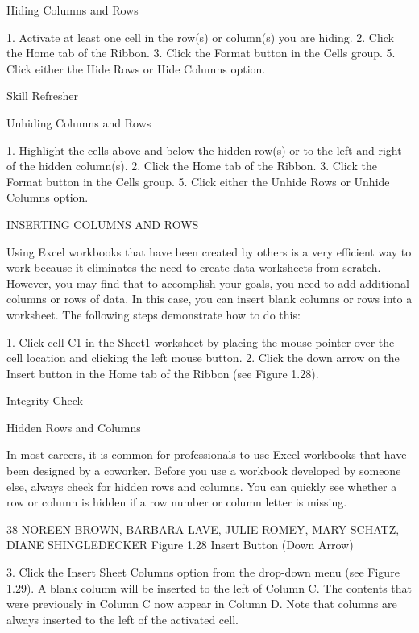 Hiding Columns and Rows

1. Activate at least one cell in the row(s) or column(s) you are hiding.
2. Click the Home tab of the Ribbon.
3. Click the Format button in the Cells group.
5. Click either the Hide Rows or Hide Columns option.




Skill Refresher


Unhiding Columns and Rows

1. Highlight the cells above and below the hidden row(s) or to the left and right of the hidden column(s).
2. Click the Home tab of the Ribbon.
3. Click the Format button in the Cells group.
5. Click either the Unhide Rows or Unhide Columns option.



INSERTING COLUMNS AND ROWS

Using Excel workbooks that have been created by others is a very efficient way to work because it
eliminates the need to create data worksheets from scratch. However, you may find that to accomplish
your goals, you need to add additional columns or rows of data. In this case, you can insert blank
columns or rows into a worksheet. The following steps demonstrate how to do this:

1. Click cell C1 in the Sheet1 worksheet by placing the mouse pointer over the cell location and
clicking the left mouse button.
2. Click the down arrow on the Insert button in the Home tab of the Ribbon (see Figure 1.28).




Integrity Check

Hidden Rows and Columns

In most careers, it is common for professionals to use Excel workbooks that have been designed by a coworker.
Before you use a workbook developed by someone else, always check for hidden rows and columns. You can quickly
see whether a row or column is hidden if a row number or column letter is missing.




38 NOREEN BROWN, BARBARA LAVE, JULIE ROMEY, MARY SCHATZ, DIANE SHINGLEDECKER
Figure 1.28 Insert Button (Down Arrow)




3. Click the Insert Sheet Columns option from the drop-down menu (see Figure 1.29). A blank
column will be inserted to the left of Column C. The contents that were previously in Column C
now appear in Column D. Note that columns are always inserted to the left of the activated cell.




